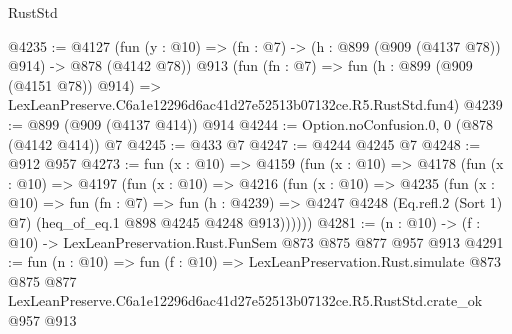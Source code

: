 \begin{lexlean}{RustStd}
\begin{coremodule}
@4235 := @4127
    (fun (y : @10) => (fn : @7) -> (h : @899 (@909 (@4137 @78)) @914) -> @878 (@4142 @78))
    @913
    (fun (fn : @7) =>
    fun (h : @899 (@909 (@4151 @78)) @914) =>
    LexLeanPreserve.C6a1e12296d6ac41d27e52513b07132ce.R5.RustStd.fun4)
@4239 := @899 (@909 (@4137 @414)) @914
@4244 := Option.noConfusion.{0, 0} (@878 (@4142 @414)) @7
@4245 := @433 @7
@4247 := @4244 @4245 @7
@4248 := @912 @957
@4273 := fun (x : @10) =>
  @4159
    (fun (x : @10) =>
    @4178
      (fun (x : @10) =>
      @4197
        (fun (x : @10) =>
        @4216
          (fun (x : @10) =>
          @4235
            (fun (x : @10) =>
            fun (fn : @7) =>
            fun (h : @4239) =>
            @4247 @4248 (Eq.refl.{2} (Sort 1) @7) (heq_of_eq.{1} @898 @4245 @4248 @913))))))
@4281 := (n : @10) -> (f : @10) -> LexLeanPreservation.Rust.FunSem @873 @875 @877 @957 @913
@4291 := fun (n : @10) =>
  fun (f : @10) =>
  LexLeanPreservation.Rust.simulate
    @873
    @875
    @877
    LexLeanPreserve.C6a1e12296d6ac41d27e52513b07132ce.R5.RustStd.crate_ok
    @957
    @913
\end{coremodule}
\end{lexlean}
